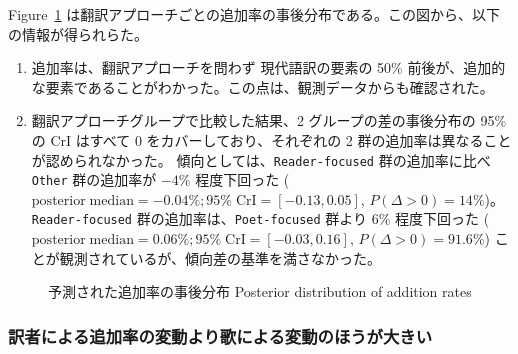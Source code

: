 \documentclass[
  letterpaper,
  DIV=11,
  numbers=noendperiod]{scrartcl}
\begin{document}
Figure~\ref{fig-poster}
は翻訳アプローチごとの追加率の事後分布である。この図から、以下の情報が得られらた。

\begin{enumerate}
\def\labelenumi{(\alph{enumi})}
\item
  追加率は、翻訳アプローチを問わず 現代語訳の要素の 50\%
  前後が、追加的な要素であることがわかった。この点は、観測データからも確認された。
\item
  翻訳アプローチグループで比較した結果、2 グループの差の事後分布の 95\%
  の CrI はすべて 0 をカバーしており、それぞれの 2
  群の追加率は異なることが認められなかった。
  傾向としては、\texttt{Reader-focused} 群の追加率に比べ \texttt{Other}
  群の追加率が \(-4\%\) 程度下回った
  (\(\mathrm{posterior\; median} = -0.04\%; 95\%\;\mathrm{CrI} = [-0.13, 0.05]\),
  \(P(\Delta>0) = 14\%\))。\texttt{Reader-focused}
  群の追加率は、\texttt{Poet-focused} 群より \(6\%\) 程度下回った
  (\(\mathrm{posterior\; median} = 0.06\%; 95\%\;\mathrm{CrI} = [-0.03, 0.16]\),
  \(P(\Delta>0) = 91.6\%\))
  ことが観測されているが、傾向差の基準を満さなかった。
\end{enumerate}

\begin{figure}


\caption{\label{fig-poster}予測された追加率の事後分布 Posterior
distribution of addition rates}

\end{figure}%

\subsubsection*{訳者による追加率の変動より歌による変動のほうが大きい}\label{ux8a33ux8005ux306bux3088ux308bux8ffdux52a0ux7387ux306eux5909ux52d5ux3088ux308aux6b4cux306bux3088ux308bux5909ux52d5ux306eux307bux3046ux304cux5927ux304dux3044}
\end{document}
